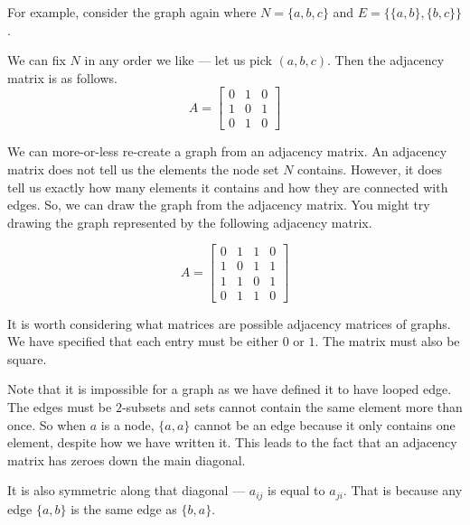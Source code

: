 \documentclass{iansnotes}
\begin{document}
  For example, consider the graph again where $N = \{a, b, c\}$ and $E = \{ \{a, b\}, \{b, c\} \}$.
  \begin{center}
  \end{center}
  We can fix $N$ in any order we like --- let us pick $(a,b,c)$.
  Then the adjacency matrix is as follows.
  \[ A = \begin{bmatrix} 0 & 1 & 0 \\ 1 & 0 & 1 \\ 0 & 1 & 0 \end{bmatrix} \]
  
  We can more-or-less re-create a graph from an adjacency matrix.
  An adjacency matrix does not tell us the elements the node set $N$ contains.
  However, it does tell us exactly how many elements it contains and how they are connected with edges.
  So, we can draw the graph from the adjacency matrix.
  You might try drawing the graph represented by the following adjacency matrix.

  \[ A = \begin{bmatrix} 0 & 1 & 1 & 0 \\ 1 & 0 & 1 & 1 \\ 1 & 1 & 0 & 1 \\ 0 & 1 & 1 & 0 \end{bmatrix} \]

  It is worth considering what matrices are possible adjacency matrices of graphs.
  We have specified that each entry must be either $0$ or $1$.
  The matrix must also be square.

  Note that it is impossible for a graph as we have defined it to have looped edge.
  The edges must be $2$-subsets and sets cannot contain the same element more than once.
  So when $a$ is a node, $\{ a, a \}$ cannot be an edge because it only contains one element, despite how we have written it.
  This leads to the fact that an adjacency matrix has zeroes down the main diagonal.
    
  It is also symmetric along that diagonal --- $a_{ij}$ is equal to $a_{ji}$.
  That is because any edge $\{ a, b \}$ is the same edge as $\{ b, a \}$.
\end{document}
